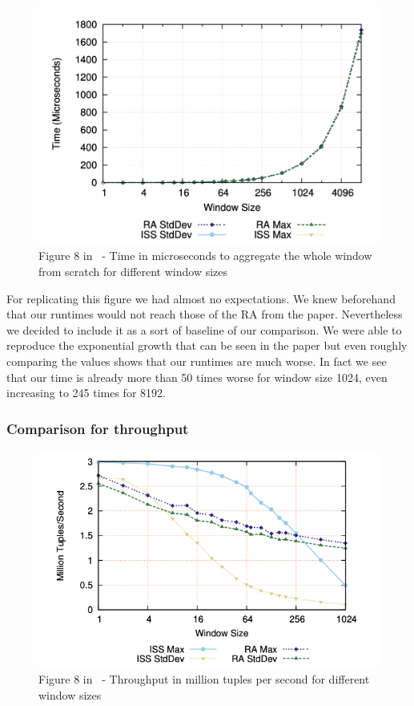 \begin{figure}[H]
	\centering
	\includegraphics[width=\linewidth]{../figures/fig8}
	\caption{Figure 8 in~\cite{GeneralIncremental15} - Time in microseconds to aggregate the whole window from scratch for different window sizes}
	\label{fig:original_architecture}
\end{figure}

For replicating this figure we had almost no expectations. We knew beforehand that
our runtimes would not reach those of the RA from the paper. Nevertheless we decided
to include it as a sort of baseline of our comparison. We were able to reproduce the
exponential growth that can be seen in the paper but even roughly comparing the
values shows that our runtimes are much worse. In fact we see that our time is already
more than 50 times worse for window size 1024, even increasing to 245 times for 8192.

\subsubsection{Comparison for throughput}



\begin{figure}[H]
	\centering
	\includegraphics[width=\linewidth]{../figures/fig6}
	\caption{Figure 8 in~\cite{GeneralIncremental15} - Throughput in million tuples per second for different window sizes}
	\label{fig:original_architecture}
\end{figure}

